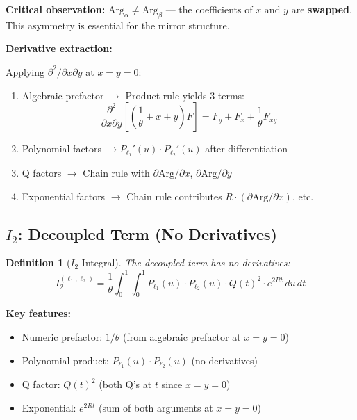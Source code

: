 \documentclass[11pt]{article}
\newtheorem{definition}{Definition}
\begin{document}
\textbf{Critical observation:} $\text{Arg}_\alpha \neq \text{Arg}_\beta$ --- the coefficients of $x$ and $y$ are \textbf{swapped}. This asymmetry is essential for the mirror structure.

\textbf{Derivative extraction:}

Applying $\partial^2/\partial x \partial y$ at $x = y = 0$:
\begin{enumerate}
\item Algebraic prefactor $\to$ Product rule yields 3 terms:
  \begin{equation}
  \frac{\partial^2}{\partial x \partial y}\left[\left(\frac{1}{\theta} + x + y\right) F\right] = F_y + F_x + \frac{1}{\theta} F_{xy}
  \end{equation}
\item Polynomial factors $\to P_{\ell_1}'(u) \cdot P_{\ell_2}'(u)$ after differentiation
\item Q factors $\to$ Chain rule with $\partial \text{Arg}/\partial x$, $\partial \text{Arg}/\partial y$
\item Exponential factors $\to$ Chain rule contributes $R \cdot (\partial \text{Arg}/\partial x)$, etc.
\end{enumerate}

\subsection{$I_2$: Decoupled Term (No Derivatives)}

\begin{definition}[$I_2$ Integral]
The decoupled term has no derivatives:
\begin{equation}
\boxed{
I_2^{(\ell_1,\ell_2)} = \frac{1}{\theta} \int_0^1 \int_0^1 P_{\ell_1}(u) \cdot P_{\ell_2}(u) \cdot Q(t)^2 \cdot e^{2Rt} \, du\, dt
}
\end{equation}
\end{definition}

\textbf{Key features:}
\begin{itemize}
\item Numeric prefactor: $1/\theta$ (from algebraic prefactor at $x=y=0$)
\item Polynomial product: $P_{\ell_1}(u) \cdot P_{\ell_2}(u)$ (no derivatives)
\item Q factor: $Q(t)^2$ (both Q's at $t$ since $x=y=0$)
\item Exponential: $e^{2Rt}$ (sum of both arguments at $x=y=0$)
\end{itemize}
\end{document}
